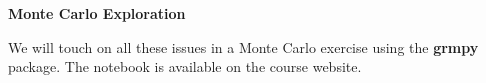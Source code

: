 \begin{frame}\textbf{Monte Carlo Exploration}\vspace{0.3cm}

We will touch on all these issues in a Monte Carlo exercise using the \textbf{grmpy} package. The notebook is available on the course website.

\end{frame}
